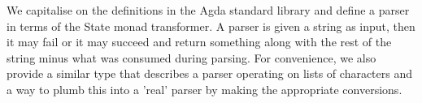 We capitalise on the definitions in the Agda standard library and define
a parser in terms of the State monad transformer. A parser is given a string
as input, then it may fail or it may succeed and return something along with
the rest of the string minus what was consumed during parsing. For convenience,
we also provide a similar type that describes a parser operating on lists of
characters and a way to plumb this into a 'real' parser by making the
appropriate conversions.

\begin{code}%
\>[0]\AgdaSpace{}%
\AgdaSpace{}%
\<%
\\
\>[0][@{}l@{\AgdaIndent{0}}]%
\>[2]\AgdaSpace{}%
\AgdaSymbol{:}\AgdaSpace{}%
\AgdaSpace{}%
\AgdaSpace{}%
\<%
\\
%
\>[2]\AgdaSpace{}%
\AgdaSymbol{=}\AgdaSpace{}%
\AgdaSpace{}%
\AgdaSymbol{(}\AgdaSpace{}%
\AgdaSymbol{)}\AgdaSpace{}%
\<%
\\
\>[0]\<%
\\
%
\>[2]\AgdaSpace{}%
\AgdaSymbol{:}\AgdaSpace{}%
\AgdaSpace{}%
\AgdaSpace{}%
\<%
\\
%
\>[2]\AgdaSpace{}%
\AgdaSymbol{=}\AgdaSpace{}%
\AgdaSpace{}%
\AgdaSpace{}%
\<%
\\
\>[0]\<%
\\
%
\>[2]\AgdaSpace{}%
\AgdaSymbol{:}\AgdaSpace{}%
\AgdaSpace{}%
\AgdaSpace{}%
\AgdaSpace{}%
\AgdaSpace{}%
\<%
\\
%
\>[2]\AgdaOperator{\AgdaFunction{→[}}\AgdaSpace{}%
\AgdaSpace{}%
\AgdaOperator{\AgdaFunction{]→}}%
\>[12]\AgdaSpace{}%
\AgdaSymbol{=}%
\>[139I]\<%
\\
\>[139I][@{}l@{\AgdaIndent{0}}]%
\>[20]\AgdaSymbol{(}\AgdaSpace{}%
\AgdaOperator{\AgdaInductiveConstructor{,}}\AgdaSpace{}%
\AgdaSymbol{)}\AgdaSpace{}%
\AgdaSpace{}%
\AgdaSymbol{(}\AgdaSpace{}%
\AgdaSpace{}%
\AgdaSymbol{)}\AgdaSpace{}%
\<%
\\
%
\>[20]\AgdaSpace{}%
\AgdaSymbol{((}\AgdaSpace{}%
\AgdaOperator{\AgdaInductiveConstructor{,}}\AgdaSpace{}%
\AgdaSpace{}%
\AgdaSymbol{))}\<%
\\
\>[.][@{}l@{}]\<[139I]%
\>[18]\AgdaSpace{}%
\AgdaSpace{}%
\<%
\end{code}

